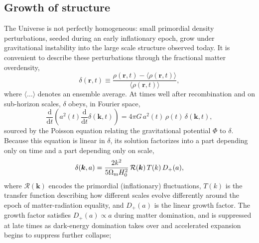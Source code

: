 \subsection{Growth of structure}

The Universe is not perfectly homogeneous: small primordial density perturbations, seeded during an early inflationary epoch, grow under gravitational instability into the large scale structure observed today. It is convenient to describe these perturbations through the fractional matter overdensity,
\begin{equation}
    \delta(\bm{r},t) \equiv \frac{\rho(\bm{r},t) - \langle\rho(\bm{r},t)\rangle}{\langle\rho(\bm{r},t)\rangle},
\end{equation}
where $\langle\dots\rangle$ denotes an ensemble average. At times well after recombination and on sub-horizon scales, $\delta$ obeys, in Fourier space,
\begin{equation}
    \frac{\text{d}}{\text{d}t}\left(a^2(t)\frac{\text{d}}{\text{d}t}\delta(\bm{k},t)\right) = 4\pi G\,a^2(t)\,\rho(t)\,\delta(\bm{k},t),
\end{equation}
sourced by the Poisson equation relating the gravitational potential $\Phi$ to $\delta$. Because this equation is linear in $\delta$, its solution factorizes into a part depending only on time and a part depending only on scale,
\begin{equation}
    \delta(\bm{k},a) = \frac{2k^2}{5\Omega_\mathrm{m} H_0^2}\,\mathcal{R}(\bm{k})\,T(k)\,D_+(a),
\end{equation}
where $\mathcal{R}(\bm{k})$ encodes the primordial (inflationary) fluctuations, $T(k)$ is the transfer function describing how different scales evolve differently around the epoch of matter-radiation equality, and $D_+(a)$ is the linear growth factor. The growth factor satisfies $D_+(a)\propto a$ during matter domination, and is suppressed at late times as dark-energy domination takes over and accelerated expansion begins to suppress further collapse;


